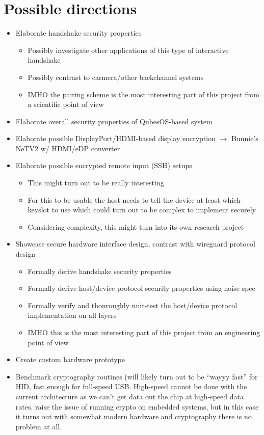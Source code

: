 \documentclass[12pt,a4paper,notitlepage]{article}
\begin{document}
\section{Possible directions}
\begin{itemize}
    \item Elaborate handshake security properties
        \begin{itemize}
            \item Possibly investigate other applications of this type of interactive handshake
            \item Possibly contrast to carmera/other backchannel systems
            \item IMHO the pairing scheme is the most interesting part of this project from a scientific point of view
        \end{itemize}
    \item Elaborate overall security properties of QubesOS-based system
    \item Elaborate possible DisplayPort/HDMI-based display encryption $\rightarrow$ Bunnie's NeTV2 w/ HDMI/eDP converter
    \item Elaborate possible encrypted remote input (SSH) setups
        \begin{itemize}
            \item This might turn out to be really interesting
            \item For this to be usable the host needs to tell the device at least which keyslot to use which could turn
                out to be complex to implement securely
            \item Considering complexity, this might turn into its own research project
        \end{itemize}
    \item Showcase secure hardware interface design, contrast with wireguard protocol design
        \begin{itemize}
            \item Formally derive handshake security properties
            \item Formally derive host/device protocol security properties using noise spec
            \item Formally verify and thouroughly unit-test the host/device protocol implementation on all layers
            \item IMHO this is the most interesting part of this project from an engineering point of view
        \end{itemize}
    \item Create custom hardware prototype
    \item Benchmark cryptography routines (will likely turn out to be ``wayyy fast'' for HID, fast enough for full-speed
        USB. High-speed cannot be done with the current architecture as we can't get data out the chip at high-speed
        data rates. \textcite{srivaths01} raise the issue of running crypto on embedded systems, but in this case it
        turns out with somewhat modern hardware and cryptography there is no problem at all.
\end{itemize}
\end{document}
